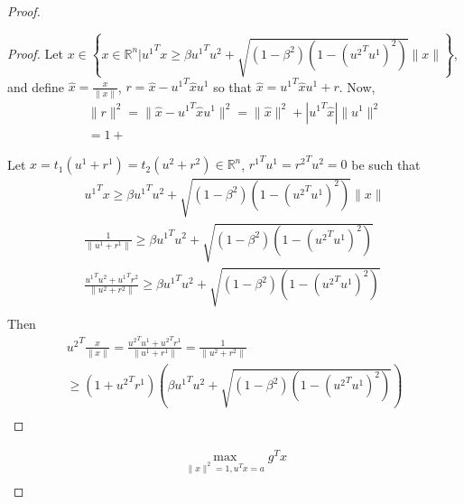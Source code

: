 \begin{proof}
\begin{proof}
Let $x \in \left\{x\in\mathbb R^n \bigg| {u^1}^Tx \ge \beta {u^1}^Tu^2 + \sqrt{(1 - \beta^2)\left(1 - ({u^2}^Tu^1)^2\right)}\|x\| \right\}$, and define $\hat x = \frac{x}{\|x\|}$, $r = \hat x - {u^1}^T\hat x u^1$ so that $\hat x = {u^1}^T\hat x u^1 + r$.
Now,
\begin{align*}
\|r\|^2 = \|\hat x - {u^1}^T\hat x u^1\|^2 = \|\hat x\|^2 + |{u^1}^T\hat x|\|{u^1}\|^2 \\
= 1 + 
\end{align*}




Let $x = t_1(u^1 + r^1)=t_2(u^2+r^2)\in\mathbb R^n$, ${r^1}^Tu^1 = {r^2}^Tu^2 = 0$ be such that 
\begin{align*}
{u^1}^Tx\ge\beta {u^1}^Tu^2 + \sqrt{(1 - \beta^2)\left(1 - ({u^2}^Tu^1)^2\right)}\|x\| \\
\frac{1}{\|u^1 + r^1\|}\ge\beta {u^1}^Tu^2 + \sqrt{(1 - \beta^2)\left(1 - ({u^2}^Tu^1)^2\right)} \\
\frac{{u^1}^Tu^2 + {u^1}^Tr^2}{\|u^2 + r^2\|}\ge\beta {u^1}^Tu^2 + \sqrt{(1 - \beta^2)\left(1 - ({u^2}^Tu^1)^2\right)} \\
\end{align*}
Then 
\begin{align*}
{u^2}^T\frac x {\|x\|} = \frac{{u^2}^Tu^1 + {u^2}^Tr^1}{\|u^1 + r^1\|} = \frac{1}{\|u^2+ r^2\|} \\
\ge (1+ {u^2}^Tr^1)\left(\beta {u^1}^Tu^2 + \sqrt{(1 - \beta^2)\left(1 - ({u^2}^Tu^1)^2\right)}\right) \\
\end{align*}


\end{proof}



\vspace{20cm}






























\newpage
\vspace{10cm}


\begin{align*}
\max_{\|x\|^2 = 1, u^Tx = a}{g^Tx} \\
\end{align*}



\end{proof}

